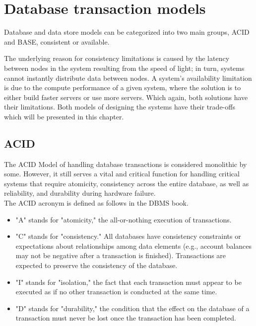\documentclass[a4paper,10pt,titlepage]{report}
\begin{document}
\chapter{Database transaction models}

Database and data store models can be categorized into two main groups, ACID and BASE,  consistent or available. 

The underlying reason for consistency limitations is caused by the latency between nodes in the system resulting from the speed of light; in turn, systems cannot instantly distribute data between nodes. A system's availability limitation is due to the compute performance of a given system, where the solution is to either build faster servers or use more servers. Which again, both solutions have their limitations. Both models of designing the systems have their trade-offs which will be presented in this chapter.



\section{ACID}
The ACID Model of handling database transactions is considered monolithic by some. However, it still serves a vital and critical function for handling critical systems that require atomicity, consistency across the entire database, as well as reliability, and durability during hardware failure.\\
\vspace{5mm}
The ACID acronym is defined as follows in the DBMS book\cite{DBMSbook}.

\begin{itemize}
    \item "A" stands for "atomicity," the all-or-nothing execution of transactions.
    \item "C" stands for "consistency." All databases
have consistency constraints or expectations about relationships among
data elements (e.g., account balances may not be negative after a transaction is finished). Transactions are expected to preserve the consistency of
the database.
\item "I" stands for "isolation," the fact that each transaction must appear
to be executed as if no other transaction is conducted at the same
time.
\item "D" stands for "durability," the condition that the effect on the
database of a transaction must never be lost once the transaction
has been completed.
\end{itemize}
\end{document}
